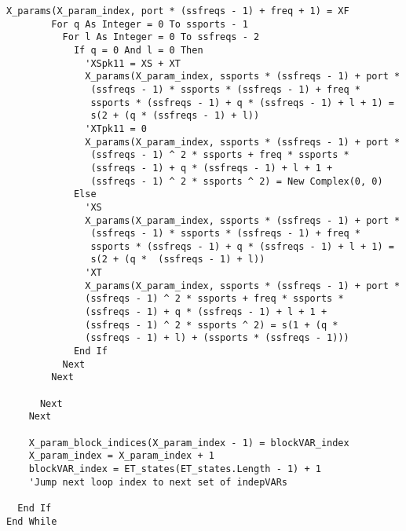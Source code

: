 \documentclass[../thesis/thesis.tex]{subfiles}
\begin{document}
\begin{lstlisting}[language=vbscript]
        X_params(X_param_index, port * (ssfreqs - 1) + freq + 1) = XF
        For q As Integer = 0 To ssports - 1
          For l As Integer = 0 To ssfreqs - 2
            If q = 0 And l = 0 Then
              'XSpk11 = XS + XT
              X_params(X_param_index, ssports * (ssfreqs - 1) + port * 
               (ssfreqs - 1) * ssports * (ssfreqs - 1) + freq * 
               ssports * (ssfreqs - 1) + q * (ssfreqs - 1) + l + 1) = 
               s(2 + (q * (ssfreqs - 1) + l))
              'XTpk11 = 0
              X_params(X_param_index, ssports * (ssfreqs - 1) + port * 
               (ssfreqs - 1) ^ 2 * ssports + freq * ssports * 
               (ssfreqs - 1) + q * (ssfreqs - 1) + l + 1 + 
               (ssfreqs - 1) ^ 2 * ssports ^ 2) = New Complex(0, 0)
            Else
              'XS
              X_params(X_param_index, ssports * (ssfreqs - 1) + port * 
               (ssfreqs - 1) * ssports * (ssfreqs - 1) + freq * 
               ssports * (ssfreqs - 1) + q * (ssfreqs - 1) + l + 1) = 
               s(2 + (q *  (ssfreqs - 1) + l))
              'XT
              X_params(X_param_index, ssports * (ssfreqs - 1) + port * 
              (ssfreqs - 1) ^ 2 * ssports + freq * ssports * 
              (ssfreqs - 1) + q * (ssfreqs - 1) + l + 1 + 
              (ssfreqs - 1) ^ 2 * ssports ^ 2) = s(1 + (q * 
              (ssfreqs - 1) + l) + (ssports * (ssfreqs - 1)))
            End If
          Next
        Next
        
      Next
    Next
    
    X_param_block_indices(X_param_index - 1) = blockVAR_index
    X_param_index = X_param_index + 1
    blockVAR_index = ET_states(ET_states.Length - 1) + 1 
    'Jump next loop index to next set of indepVARs
  
  End If
End While
\end{lstlisting}
\end{document}
